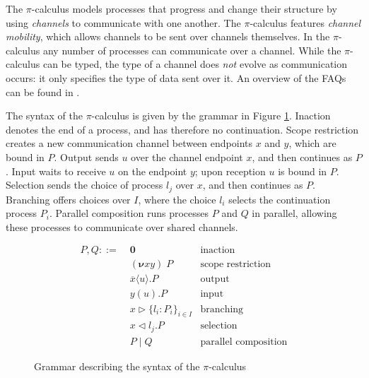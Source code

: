 \documentclass{mproj}
\newcommand{\PO}{\mathbf{0}}
\newcommand{\comp}[2]{#1 \mid #2}
\newcommand{\new}[2]{(\boldsymbol{\nu} #1 #2) \;}
\newcommand{\cout}[2]{\overline{#1}\langle#2\rangle.}
\newcommand{\cin}[2]{#1(#2).}
\newcommand{\select}[2]{#1\triangleleft#2.}
\newcommand{\branch}[2]{#1\triangleright#2}
\newcommand{\picalc}{$\pi$-calculus}
\begin{document}
The \picalc{} \cite{Walker1989,Milner1989,Milner1991,Sangiorgi2001} models processes that progress and change their structure by using \emph{channels} to communicate with one another. The \picalc{} features \emph{channel mobility}, which allows channels to be sent over channels themselves. In the \picalc{} any number of processes can communicate over a channel. While the \picalc{} can be typed, the type of a channel does \emph{not} evolve as communication occurs: it only specifies the type of data sent over it. An overview of the FAQs can be found in \cite{Wing2002}.

The syntax of the \picalc{} is given by the grammar in Figure \ref{picalc-syntax}. Inaction denotes the end of a process, and has therefore no continuation. Scope restriction creates a new communication channel between endpoints $x$ and $y$, which are bound in $P$. Output sends $u$ over the channel endpoint $x$, and then continues as $P$. Input waits to receive $u$ on the endpoint $y$; upon reception $u$ is bound in $P$. Selection sends the choice of process $l_j$ over $x$, and then continues as $P$. Branching offers choices over $I$, where the choice $l_i$ selects the continuation process $P_i$. Parallel composition runs processes $P$ and $Q$ in parallel, allowing these processes to communicate over shared channels.

\begin{figure}[H]
    \begin{align*}
    P,Q ::= \; &\PO                      & \text{inaction}             \\
               &\new{x}{y}P              & \text{scope restriction}    \\
               &\cout{x}{u}P             & \text{output}               \\
               &\cin{y}{u}P              & \text{input}                \\
               &\branch{x}
               {\{l_i : P_i\}_{i \in I}} & \text{branching}            \\
               &\select{x}{l_j}P         & \text{selection}            \\
               &\comp{P}{Q}              & \text{parallel composition}
    \end{align*}
    \caption{Grammar describing the syntax of the \picalc{}}
    \label{picalc-syntax}
\end{figure}
\end{document}
